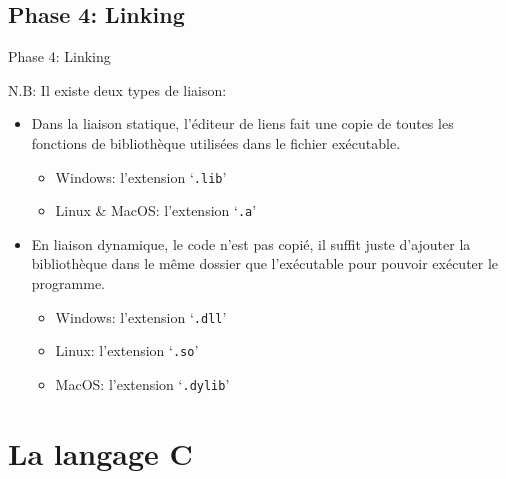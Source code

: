 \documentclass{beamer}
\begin{document}
\begin{darkframes}
	\subsection{Phase 4: Linking}
	\begin{frame}{Phase 4: Linking}
		\begin{alertblock}{N.B:}
			Il existe deux types de liaison:
			\begin{itemize}
				\item Dans la \alert{liaison statique}, l'éditeur de liens fait une copie de toutes les fonctions de bibliothèque utilisées dans le fichier exécutable.
				\begin{itemize}
					\item Windows: l'extension `\texttt{.lib}'
					\item Linux \& MacOS: l'extension `\texttt{.a}'
				\end{itemize}
				\item En \alert{liaison dynamique}, le code n'est pas copié, il suffit juste d'ajouter la bibliothèque dans le même dossier que l'exécutable pour pouvoir exécuter le programme.
				\begin{itemize}
					\item Windows: l'extension `\texttt{.dll}'
					\item Linux: l'extension `\texttt{.so}'
					\item MacOS: l'extension `\texttt{.dylib}'
				\end{itemize}
			\end{itemize}
		\end{alertblock}
	\end{frame}
	  	
  	\section{La langage C}

\end{darkframes}
\end{document}
